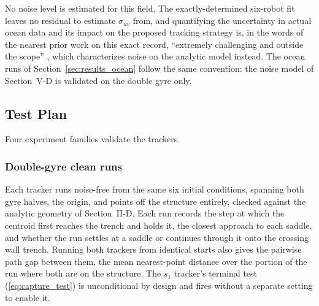 \documentclass[lettersize,journal]{IEEEtran}
\begin{document}
No noise level is estimated for this field. The exactly-determined
six-robot fit leaves no residual to estimate $\sigma_{uv}$ from, and
quantifying the uncertainty in actual ocean data and its impact on the
proposed tracking strategy is, in the words of the nearest prior work
on this exact record, ``extremely challenging and outside the scope''
\cite{9}, which characterizes noise on the analytic model instead. The
ocean runs of Section~\ref{sec:results_ocean} follow the same
convention: the noise model of Section~\mbox{V-D} is validated on the
double gyre only.

\subsection{Test Plan}
\label{sec:test_plan}

Four experiment families validate the trackers.

\subsubsection{Double-gyre clean runs}
Each tracker runs noise-free from the same six initial conditions,
spanning both gyre halves, the origin, and points off the structure
entirely, checked against the analytic geometry of Section~\mbox{II-D}. Each
run records the step at which the
centroid first reaches the trench and holds it, the closest approach to
each saddle, and whether the run settles at a saddle or continues
through it onto the crossing wall trench. Running both trackers from
identical starts also gives the pairwise path gap between them, the mean
nearest-point distance over the portion of the run where both are on the
structure. The $s_1$ tracker's terminal test (\ref{eq:capture_test}) is
unconditional by design and fires without a separate setting to enable it.
\end{document}
